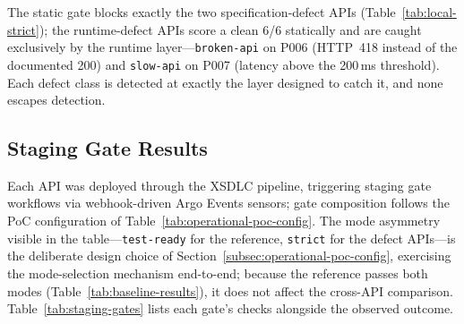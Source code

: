 The static gate blocks exactly the two specification-defect APIs (Table~\ref{tab:local-strict}); the runtime-defect APIs score a clean 6/6 statically and are caught exclusively by the runtime layer---\texttt{broken-api} on P006 (HTTP~418 instead of the documented 200) and \texttt{slow-api} on P007 (latency above the 200\,ms threshold). Each defect class is detected at exactly the layer designed to catch it, and none escapes detection.

\subsection{Staging Gate Results}
\label{subsec:staging-results}

Each API was deployed through the XSDLC pipeline, triggering staging gate workflows via webhook-driven Argo Events sensors; gate composition follows the PoC configuration of Table~\ref{tab:operational-poc-config}. The mode asymmetry visible in the table---\texttt{test-ready} for the reference, \texttt{strict} for the defect APIs---is the deliberate design choice of Section~\ref{subsec:operational-poc-config}, exercising the mode-selection mechanism end-to-end; because the reference passes both modes (Table~\ref{tab:baseline-results}), it does not affect the cross-API comparison. Table~\ref{tab:staging-gates} lists each gate's checks alongside the observed outcome.

\begin{table}[htbp]
\centering
\caption{Staging gate results for all five evaluation APIs.}
\label{tab:staging-gates}
\small
{}
\end{table}

